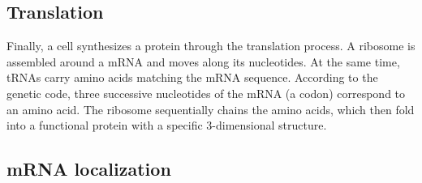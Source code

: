 

\subsection{Translation}
\label{subsec:intro_translation}

Finally, a cell synthesizes a protein through the translation process.
A ribosome is assembled around a \ac{mRNA} and moves along its nucleotides.
At the same time, \ac{tRNA}s carry amino acids matching the \ac{mRNA} sequence.
According to the genetic code, three successive nucleotides of the \ac{mRNA} (a codon) correspond to an amino acid.
The ribosome sequentially chains the amino acids, which then fold into a functional protein with a specific 3-dimensional structure.


\subsection{mRNA localization}
\label{subsec:intro_rna_loc}



